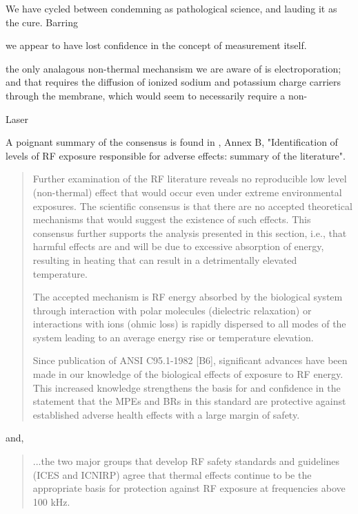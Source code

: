 \documentclass[paper.tex]{subfiles}
\begin{document}
We have cycled between condemning as pathological science, and lauding it as the cure. Barring 


we appear to have lost confidence in the concept of measurement itself.



the only analagous non-thermal mechansism we are aware of is electroporation; and that requires the diffusion of ionized sodium and potassium charge carriers through the membrane, which would seem to necessarily require a non-

Laser









A poignant summary of the consensus is found in \cite{IEEE2006}, Annex B, "Identification of levels of RF exposure responsible for adverse effects: summary of the literature".

\begin{quote}
	Further examination of the RF literature reveals no reproducible low level (non-thermal) effect that would
	occur even under extreme environmental exposures. The scientific consensus is that there are no accepted
	theoretical mechanisms that would suggest the existence of such effects. This consensus further supports the
	analysis presented in this section, i.e., that harmful effects are and will be due to excessive absorption of
	energy, resulting in heating that can result in a detrimentally elevated temperature. 
	
	The accepted mechanism is RF energy absorbed by the biological system through interaction with polar molecules (dielectric relaxation) or interactions with ions (ohmic loss) is rapidly dispersed to all modes of the system leading to an average energy rise or temperature elevation. 
	
	Since publication of ANSI C95.1-1982 [B6], significant advances have been made in our knowledge of the biological effects of exposure to RF energy. This increased knowledge strengthens the basis for and confidence in the statement that the MPEs and BRs in this	standard are protective against established adverse health effects with a large margin of safety.
\end{quote}

and, 

\begin{quote}
	...the two major groups that develop RF safety standards and
	guidelines (ICES and ICNIRP) agree that thermal effects continue to be the appropriate basis for protection
	against RF exposure at frequencies above 100 kHz.
\end{quote}
\end{document}
